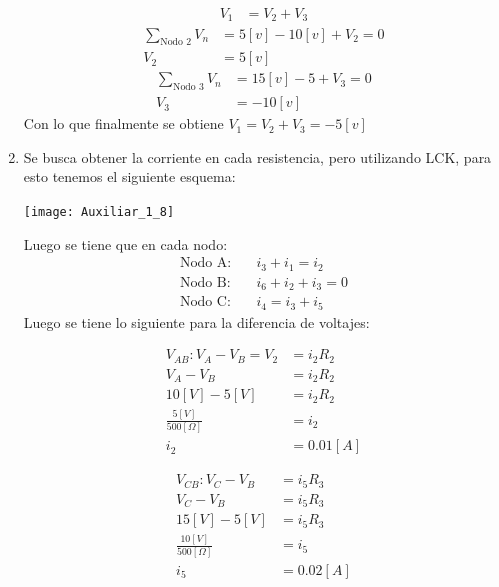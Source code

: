 \documentclass[
  11pt,
  letterpaper,
   addpoints,
   answers
  ]{exam}
\begin{document}
\begin{questions}
\begin{solution}
\begin{enumerate}
\begin{align}
        V_{1} &= V_{2} + V_{3}
    \end{align}
    \begin{align}
        \sum_{\text{Nodo 2}} V_{n} &= 5[v] - 10[v] + V_{2} = 0\\
        V_{2} &= 5[v]
    \end{align}
    \begin{align}
        \sum_{\text{Nodo 3}} V_{n} &= 15[v] - 5 + V_{3} = 0\\
        V_{3} &= -10[v]
    \end{align}
    Con lo que finalmente se obtiene $V_1 = V_2 + V_3 = -5[v]$
    \item Se busca obtener la corriente en cada resistencia, pero utilizando LCK, para esto tenemos el siguiente esquema:
    \begin{center}
        \texttt{[image: Auxiliar\_1\_8]}
    \end{center}
    Luego se tiene que en cada nodo:
    \begin{align}
    \text{Nodo A:} \quad & i_3 + i_1 = i_2 \\
    \text{Nodo B:} \quad & i_6 + i_2 + i_3 = 0 \\
    \text{Nodo C:} \quad & i_4 = i_3 + i_5
    \end{align}
    Luego se tiene lo siguiente para la diferencia de voltajes:
    \begin{multicols}{2} %

        \begin{align*}
            V_{AB}: V_A - V_B = V_2 &= i_2 R_2 \\
            V_A - V_B &= i_2 R_2 \\
            10[V] - 5[V] &= i_2 R_2 \\
            \frac{5[V]}{500[\Omega]} &= i_2 \\
            i_2 &= 0.01[A]
        \end{align*}
    
        \begin{align*}
            V_{CB} : V_C - V_B &= i_5 R_3 \\
            V_C - V_B &= i_5 R_3 \\
            15[V] - 5[V] &= i_5 R_3 \\
            \frac{10[V]}{500[\Omega]} &= i_5 \\
            i_5 &= 0.02[A]
        \end{align*}
    

\end{multicols}
\end{enumerate}
\end{solution}
\end{questions}
\end{document}

